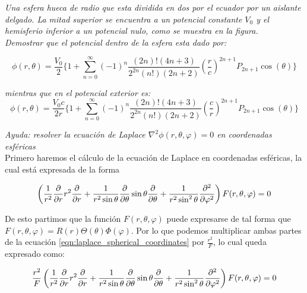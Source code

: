 \documentclass[11pt]{report}
\theoremstyle{plain}
\theoremstyle{definition}
\begin{document}

\textit{Una esfera hueca de radio que esta dividida en dos por el ecuador por un aislante delgado. La mitad superior se encuentra a un potencial constante $V_0$ y el hemisferio inferior a un potencial nulo, como se muestra en la figura.}\\

\textit{Demostrar que el potencial dentro de la esfera esta dado por:}

\begin{equation}
	\label{eq:final_in}
	\phi(r, \theta) = \frac{V_0}{2}\{ 1 +\sum^\infty_{n=0}(-1)^n \frac{(2n)!(4n+3)}{2^{2n}(n!)(2n+2)}\left(\frac{r}{c}\right)^{2n+1}P_{2n+1}\cos(\theta)\}
\end{equation}

\textit{mientras que en el potencial exterior es:}
\begin{equation}
	\label{eq:final_out}
	\phi(r, \theta) = \frac{V_0c}{2r}\{ 1 +\sum^\infty_{n=0}(-1)^n \frac{(2n)!(4n+3)}{2^{2n}(n!)(2n+2)}\left(\frac{c}{r}\right)^{2n+1}P_{2n+1}\cos(\theta)\}
\end{equation}


\textit{Ayuda: resolver la ecuación de Laplace $\nabla^2 \phi(r,\theta,\varphi) =0$ en coordenadas esféricas}\\



Primero haremos el cálculo de la ecuación de Laplace en coordenadas esféricas, la cual está expresada de la forma

\begin{equation} %
\label{eqn:laplace_spherical_coordinates}
	\left(\frac{1}{r^2}\pdv{r}r^2\pdv{r} + \frac{1}{r^2\sin\theta}\pdv{\theta}\sin\theta\pdv{\theta} + \frac{1}{r^2\sin^2\theta}\pdv[2]{\varphi}\right)F(r,\theta,\varphi) = 0
\end{equation}


De esto partimos que la función $F(r,\theta,\varphi)$ puede expresarse de tal forma que $F(r,\theta,\varphi)=R(r)\Theta(\theta)\Phi(\varphi)$. Por lo que podemos multiplicar ambas partes de la ecuación \ref{eqn:laplace_spherical_coordinates} por $\frac{r^2}{F}$, lo cual queda expresado como:

\begin{equation*} %
	\frac{r^2}{F} \left(\frac{1}{r^2}\pdv{r}r^2\pdv{r} + \frac{1}{r^2\sin\theta}\pdv{\theta}\sin\theta\pdv{\theta} + \frac{1}{r^2\sin^2\theta}\pdv[2]{\varphi}\right)F(r,\theta,\varphi) = 0
\end{equation*}
\end{document}
